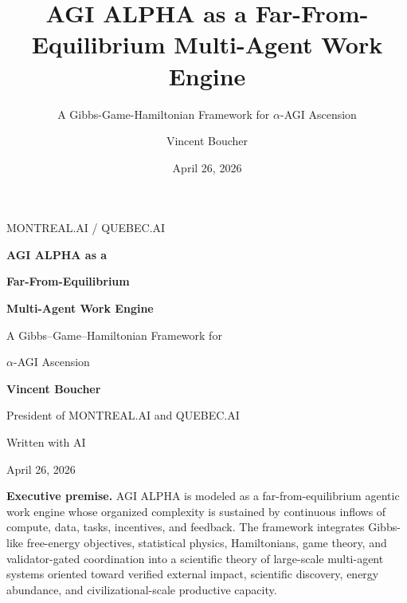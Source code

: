 \documentclass[
  11pt,
]{article}
\title{AGI ALPHA as a Far-From-Equilibrium Multi-Agent Work Engine}
\subtitle{A Gibbs-Game-Hamiltonian Framework for $\alpha$-AGI Ascension}
\author{Vincent Boucher}
\date{April 26, 2026}
\begin{document}
\begin{titlepage}
\thispagestyle{empty}
\centering
\vspace*{0.55cm}
\begin{tcolorbox}[enhanced, width=0.86\textwidth, colback=white, colframe=AgiBlue!32, boxrule=0.75pt, arc=4pt, left=20pt, right=20pt, top=18pt, bottom=18pt]
\centering
{\large\textsc{MONTREAL.AI / QUEBEC.AI}\par}
\vspace{1.15cm}
{\fontsize{28}{33}\selectfont\bfseries\color{AgiBlue} AGI ALPHA as a\par}
\vspace{0.06cm}
{\fontsize{28}{33}\selectfont\bfseries\color{AgiBlue} Far-From-Equilibrium\par}
\vspace{0.06cm}
{\fontsize{28}{33}\selectfont\bfseries\color{AgiBlue} Multi-Agent Work Engine\par}
\vspace{0.56cm}
{\Large A Gibbs--Game--Hamiltonian Framework for\par}
\vspace{0.06cm}
{\Large $\alpha$-AGI Ascension\par}
\vspace{0.75cm}
{\large\bfseries Vincent Boucher\par}
\vspace{0.12cm}
{\normalsize President of MONTREAL.AI and QUEBEC.AI\par}
{\normalsize Written with AI\par}
\vspace{0.12cm}
{\normalsize April 26, 2026\par}
\vspace{0.62cm}
\begin{tcolorbox}[enhanced, width=0.92\linewidth, colback=AgiBlue!2, colframe=AgiGold!45, boxrule=0.55pt, arc=3pt, left=9pt, right=9pt, top=8pt, bottom=8pt]
\raggedright
\textbf{Executive premise.} AGI ALPHA is modeled as a far-from-equilibrium agentic work engine whose organized complexity is sustained by continuous inflows of compute, data, tasks, incentives, and feedback. The framework integrates Gibbs-like free-energy objectives, statistical physics, Hamiltonians, game theory, and validator-gated coordination into a scientific theory of large-scale multi-agent systems oriented toward verified external impact, scientific discovery, energy abundance, and civilizational-scale productive capacity.
\end{tcolorbox}
\vspace{0.35cm}

\end{tcolorbox}
\end{titlepage}
\end{document}
